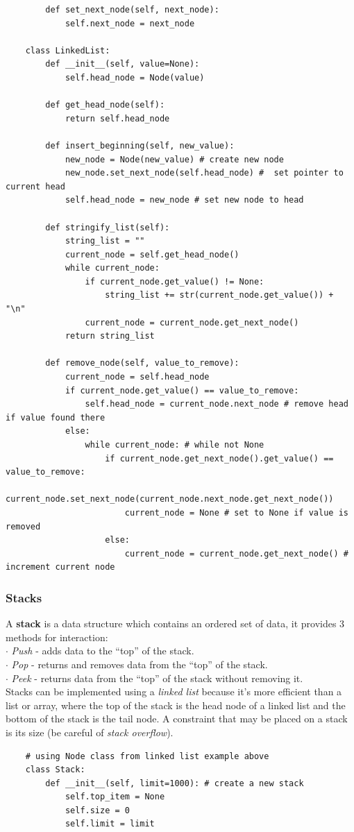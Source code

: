 \documentclass[11pt, a4paper]{article}
\begin{document}
\begin{spacing}{1.1}
\begin{lstlisting}
		def set_next_node(self, next_node):
			self.next_node = next_node
		
	class LinkedList:
		def __init__(self, value=None):
			self.head_node = Node(value)
		
		def get_head_node(self):
			return self.head_node
		
		def insert_beginning(self, new_value):
			new_node = Node(new_value) # create new node
			new_node.set_next_node(self.head_node) #  set pointer to current head
			self.head_node = new_node # set new node to head
		
		def stringify_list(self):
			string_list = ""
			current_node = self.get_head_node()
			while current_node:
				if current_node.get_value() != None:
					string_list += str(current_node.get_value()) + "\n"
				current_node = current_node.get_next_node()
			return string_list
			
		def remove_node(self, value_to_remove):
			current_node = self.head_node
			if current_node.get_value() == value_to_remove:
				self.head_node = current_node.next_node # remove head if value found there
			else:
				while current_node: # while not None
					if current_node.get_next_node().get_value() == value_to_remove:
						current_node.set_next_node(current_node.next_node.get_next_node())
						current_node = None # set to None if value is removed
					else:
						current_node = current_node.get_next_node() # increment current node \end{lstlisting}\newpage
	\subsubsection{Stacks}
	A \textbf{stack} is a data structure which contains an ordered set of data, it provides 3 methods for interaction: \\
	\hspace*{1.5mm} $\cdot$ \textit{Push} - adds data to the “top” of the stack. \\
	\hspace*{1.5mm} $\cdot$ \textit{Pop} - returns and removes data from the “top” of the stack. \\
	\hspace*{1.5mm} $\cdot$ \textit{Peek} - returns data from the “top” of the stack without removing it. \\
	Stacks can be implemented using a \textit{linked list} because it’s more efficient than a list or array, where the top of the stack is the head node of a linked list and the bottom of the stack is the tail node. A constraint that may be placed on a stack is its size (be careful of \textit{stack overflow}).
	\begin{lstlisting}
	# using Node class from linked list example above
	class Stack:
		def __init__(self, limit=1000): # create a new stack
			self.top_item = None
			self.size = 0
			self.limit = limit
		

\end{lstlisting}
\end{spacing}
\end{document}
